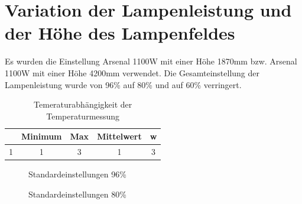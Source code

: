\documentclass[a4paper,bibtotoc,oneside]{scrbook}
\begin{document}
\FloatBarrier

\section{Variation der Lampenleistung und der Höhe des Lampenfeldes}

Es wurden die Einstellung Arsenal 1100W mit einer Höhe 1870mm bzw. Arsenal 1100W mit einer Höhe 4200mm verwendet. Die Gesamteinstellung der Lampenleistung wurde von 96\% auf 80\% und auf 60\% verringert.

\begin{table}[htbp]
\centering
\begin{tabular}{ | c | c | c |c | c |}\hline
{\bf} & {\bf Minimum} & {\bf Max} & {\bf Mittelwert} & {\bf w}\\ \hline
\hline
1 & 1 & 3 & 1 & 3\\ \hline
\end{tabular}
\caption{Temeraturabhängigkeit der Temperaturmessung}\label{TabT33}
\end{table}

\begin{figure} [htbp]
\caption{Standardeinstellungen 96\%}
\label{st96}
\end{figure} 

\begin{figure} [htbp]
\caption{Standardeinstellungen 80\%}
\label{st80}
\end{figure} 
\end{document}
